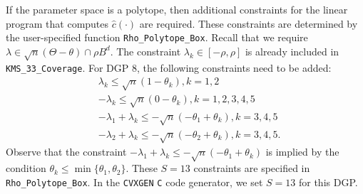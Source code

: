 \documentclass[12pt]{article}
\def\code#1{\texttt{#1}}
\begin{document}
\begin{appendices}
If the parameter space is a polytope, then additional constraints for the linear program that computes $\hat c(\cdot)$ are required.  These constraints are determined by the user-specified function \code{Rho\_Polytope\_Box}.  Recall that we require $\lambda \in \sqrt{n}(\Theta - \theta)\cap \rho B^d$.  The constraint $\lambda_k \in [-\rho,\rho]$ is already included in \code{KMS\_33\_Coverage}.  For DGP 8, the following constraints need to be added:
\begin{align*}
&\lambda_k \leq \sqrt{n}(1 - \theta_k), k =1,2\\
&-\lambda_k \leq \sqrt{n}(0 - \theta_k), k = 1,2,3,4,5 \\
& -\lambda_1 + \lambda_k \leq - \sqrt{n}(- \theta_1 + \theta_k), k =3,4,5\\
& -\lambda_2 + \lambda_k \leq - \sqrt{n}(- \theta_2 + \theta_k), k =3,4,5.
\end{align*}
Observe that the constraint $-\lambda_1 + \lambda_k \leq - \sqrt{n}(- \theta_1 + \theta_k)$ is implied by the condition $\theta_k \leq \min\{\theta_1,\theta_2\}$.   These $S=13$ constraints are specified in \code{Rho\_Polytope\_Box}.  In the \code{CVXGEN} \code{C} code generator, we set $S=13$ for this DGP.
\end{appendices}
\end{document}
